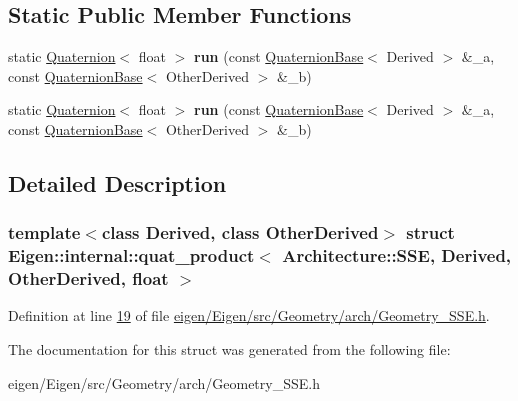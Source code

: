 \subsection*{Static Public Member Functions}
\begin{DoxyCompactItemize}
\item 
\mbox{\label{struct_eigen_1_1internal_1_1quat__product_3_01_architecture_1_1_s_s_e_00_01_derived_00_01_other_derived_00_01float_01_4_af3cb75670326cf2046e624b8b11c0971}} 
static \hyperlink{group___geometry___module_class_eigen_1_1_quaternion}{Quaternion}$<$ float $>$ {\bfseries run} (const \hyperlink{group___geometry___module_class_eigen_1_1_quaternion_base}{Quaternion\+Base}$<$ Derived $>$ \&\+\_\+a, const \hyperlink{group___geometry___module_class_eigen_1_1_quaternion_base}{Quaternion\+Base}$<$ Other\+Derived $>$ \&\+\_\+b)
\item 
\mbox{\label{struct_eigen_1_1internal_1_1quat__product_3_01_architecture_1_1_s_s_e_00_01_derived_00_01_other_derived_00_01float_01_4_af3cb75670326cf2046e624b8b11c0971}} 
static \hyperlink{group___geometry___module_class_eigen_1_1_quaternion}{Quaternion}$<$ float $>$ {\bfseries run} (const \hyperlink{group___geometry___module_class_eigen_1_1_quaternion_base}{Quaternion\+Base}$<$ Derived $>$ \&\+\_\+a, const \hyperlink{group___geometry___module_class_eigen_1_1_quaternion_base}{Quaternion\+Base}$<$ Other\+Derived $>$ \&\+\_\+b)
\end{DoxyCompactItemize}


\subsection{Detailed Description}
\subsubsection*{template$<$class Derived, class Other\+Derived$>$\newline
struct Eigen\+::internal\+::quat\+\_\+product$<$ Architecture\+::\+S\+S\+E, Derived, Other\+Derived, float $>$}



Definition at line \hyperlink{eigen_2_eigen_2src_2_geometry_2arch_2_geometry___s_s_e_8h_source_l00019}{19} of file \hyperlink{eigen_2_eigen_2src_2_geometry_2arch_2_geometry___s_s_e_8h_source}{eigen/\+Eigen/src/\+Geometry/arch/\+Geometry\+\_\+\+S\+S\+E.\+h}.



The documentation for this struct was generated from the following file\+:\begin{DoxyCompactItemize}
\item 
eigen/\+Eigen/src/\+Geometry/arch/\+Geometry\+\_\+\+S\+S\+E.\+h\end{DoxyCompactItemize}
